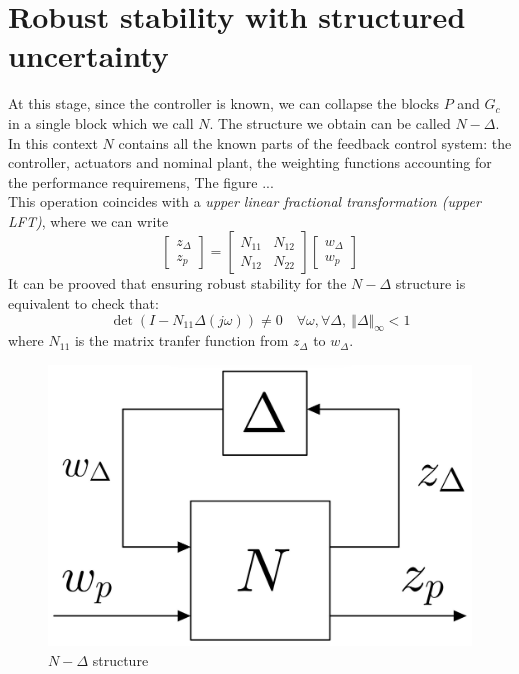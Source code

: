 \documentclass[a4paper, 12pt]{article}
\begin{document}
\section{Robust stability with structured uncertainty}
At this stage, since the controller is known, we can collapse the blocks $P$ and $G_c$ in a single block which we call $N$. The structure we obtain can be called $N-\Delta$. In this context $N$ contains all the known parts of the feedback control system: the controller, actuators and nominal plant, the weighting functions accounting for the performance requiremens, The figure ...\\
This operation coincides with a \textit{upper linear fractional transformation (upper LFT)}, where we can write
\begin{equation}
    \begin{bmatrix}
        z_\Delta\\
        z_p
    \end{bmatrix}=\begin{bmatrix}
        N_{11}&N_{12}\\
        N_{12}&N_{22}
    \end{bmatrix}
    \begin{bmatrix}
        w_\Delta\\
        w_p
    \end{bmatrix}
\end{equation}
It can be prooved that ensuring robust stability for the $N-\Delta$ structure is equivalent to check that: 
\begin{equation}\label{eq:RS_cond}
    \det(I-N_{11}\Delta(j\omega))\ne0 \quad \forall \omega, \forall \Delta, \ \Vert \Delta \Vert_\infty<1
\end{equation}
where $N_{11}$ is the matrix tranfer function from $z_\Delta$ to $w_\Delta$.


\begin{figure}[h]
    \centering
    \includegraphics[scale=0.13]{img/NDelta.jpg}
    \caption{$N-\Delta$ structure}
\end{figure}
\end{document}
